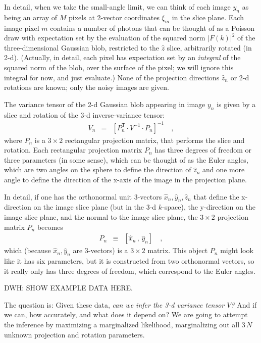 \documentclass[12pt]{article}
\newcommand{\sqnorm}[1]{|{#1}|^2}
\newcommand{\unitvec}[1]{\hat{#1}}
\newcommand{\xhat}{\unitvec{x}}
\newcommand{\yhat}{\unitvec{y}}
\newcommand{\zhat}{\unitvec{z}}
\newcommand{\transpose}{^{\mathsf{T}}}
\begin{document}
In detail, when we take the small-angle limit, we can think of each
image $y_n$ as being an array of $M$ pixels at
2-vector coordinates $\xi_m$ in the slice plane.
Each image pixel $m$ contains a number of photons that can be thought
of as a Poisson draw with expectation set by the evaluation of the
squared norm $\sqnorm{F(k)}$ of the three-dimensional Gaussian
blob, restricted to the $\zhat$ slice, arbitrarily rotated (in 2-d).
(Actually, in detail, each pixel has expectation set by an
\emph{integral} of the squared norm of the blob, over the surface of
the pixel; we will ignore this integral for now, and just evaluate.)
None of the projection directions $\zhat_n$ or 2-d rotations are
known; only the noisy images are given.

The variance tensor of the 2-d Gaussian blob appearing in image $y_n$
is given by a slice and rotation of the 3-d inverse-variance tensor:
\begin{eqnarray}
  V_n &=& [P_n\transpose\cdot V^{-1}\cdot P_n]^{-1}
  \quad ,
\end{eqnarray}
where $P_n$ is a $3\times 2$ rectangular projection matrix, that
performs the slice and rotation.
Each rectangular projection matrix $P_n$ has three degrees of freedom or three
parameters (in some sense), which can be thought of as the Euler
angles, which are two angles on the sphere to define the direction of
$\zhat_n$ and one more angle to define the direction of the x-axis of
the image in the projection plane.

In detail, if one has the orthonormal unit 3-vectors
$\xhat_n,\yhat_n,\zhat_n$ that define the x-direction on the image
slice plane (but in the 3-d $k$-space), the y-direction on the image
slice plane, and the normal to the image slice plane, the $3\times 2$
projection matrix $P_n$ becomes
\begin{eqnarray}
  P_n &\equiv& [\xhat_n\,,\,\yhat_n]
  \quad ,
\end{eqnarray}
which (because $\xhat_n,\yhat_n$ are 3-vectors) is a $3\times2$ matrix.
This object $P_n$ might look like it has six parameters, but it is
constructed from two orthonormal vectors, so it really only has three
degrees of freedom, which correspond to the Euler angles.

DWH: SHOW EXAMPLE DATA HERE.

The question is:
Given these data, \emph{can we infer the 3-d variance tensor $V$?}
And if we can, how accurately, and what does it depend on?  We are
going to attempt the inference by maximizing a marginalized
likelihood, marginalizing out all $3\,N$ unknown projection and
rotation parameters.
\end{document}
